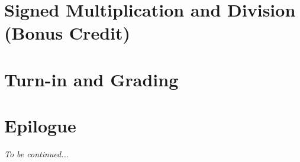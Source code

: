 \documentclass[12pt]{article}
\begin{document}
    \section{Signed Multiplication and Division (Bonus Credit)}                     

    \section{Turn-in and Grading}                                                   

    \section*{Epilogue}                                                             \scenariowrapup

    \textit{To be continued...}
\end{document}
